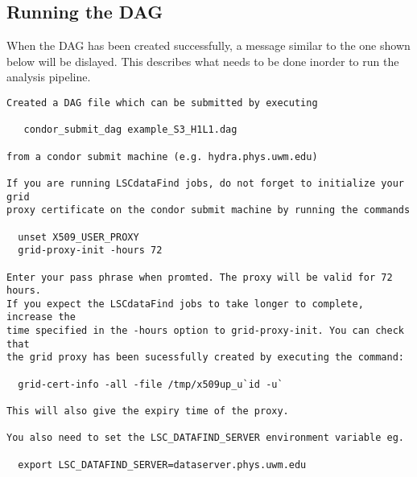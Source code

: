 \subsection{Running the DAG}

When the DAG has been created successfully, a message similar to the one
shown below will be dislayed. This describes what needs to be done
inorder to run the analysis pipeline.

\begin{verbatim}
Created a DAG file which can be submitted by executing

   condor_submit_dag example_S3_H1L1.dag

from a condor submit machine (e.g. hydra.phys.uwm.edu)

If you are running LSCdataFind jobs, do not forget to initialize your grid
proxy certificate on the condor submit machine by running the commands

  unset X509_USER_PROXY
  grid-proxy-init -hours 72

Enter your pass phrase when promted. The proxy will be valid for 72 hours.
If you expect the LSCdataFind jobs to take longer to complete, increase the
time specified in the -hours option to grid-proxy-init. You can check that
the grid proxy has been sucessfully created by executing the command:

  grid-cert-info -all -file /tmp/x509up_u`id -u`

This will also give the expiry time of the proxy.

You also need to set the LSC_DATAFIND_SERVER environment variable eg.

  export LSC_DATAFIND_SERVER=dataserver.phys.uwm.edu
\end{verbatim}
